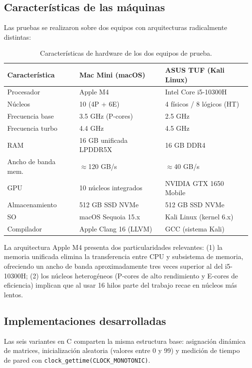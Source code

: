 \documentclass{article}
\begin{document}
\subsection{Características de las máquinas}

Las pruebas se realizaron sobre dos equipos con arquitecturas radicalmente distintas:

\begin{table}[H]
\centering
\begin{tabular}{lll}
\toprule
\textbf{Característica} & \textbf{Mac Mini (macOS)} & \textbf{ASUS TUF (Kali Linux)} \\
\midrule
Procesador & Apple M4 & Intel Core i5-10300H \\
Núcleos & 10 (4P + 6E) & 4 físicos / 8 lógicos (HT) \\
Frecuencia base & 3.5 GHz (P-cores) & 2.5 GHz \\
Frecuencia turbo & 4.4 GHz & 4.5 GHz \\
RAM & 16 GB unificada LPDDR5X & 16 GB DDR4 \\
Ancho de banda mem. & $\approx$120 GB/s & $\approx$40 GB/s \\
GPU & 10 núcleos integrados & NVIDIA GTX 1650 Mobile \\
Almacenamiento & 512 GB SSD NVMe & 512 GB SSD NVMe \\
SO & macOS Sequoia 15.x & Kali Linux (kernel 6.x) \\
Compilador & Apple Clang 16 (LLVM) & GCC (sistema Kali) \\
\bottomrule
\end{tabular}
\caption{Características de hardware de los dos equipos de prueba.}
\label{tab:hardware}
\end{table}

La arquitectura Apple M4 presenta dos particularidades relevantes: (1) la memoria unificada elimina la transferencia entre CPU y subsistema de memoria, ofreciendo un ancho de banda aproximadamente tres veces superior al del i5-10300H; (2) los núcleos heterogéneos (P-cores de alto rendimiento y E-cores de eficiencia) implican que al usar 16 hilos parte del trabajo recae en núcleos más lentos.

\subsection{Implementaciones desarrolladas}

Las seis variantes en C comparten la misma estructura base: asignación dinámica de matrices, inicialización aleatoria (valores entre 0 y 99) y medición de tiempo de pared con \texttt{clock\_gettime(CLOCK\_MONOTONIC)}.
\end{document}
